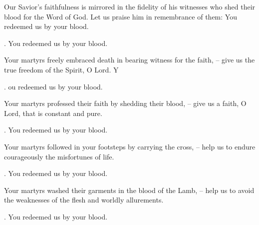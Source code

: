 \lettrine[lines=2]{O}{}ur Savior’s faithfulness is mirrored in the fidelity of his witnesses who shed their blood for the Word of God. Let us praise him in remembrance of them: You redeemed us by your blood.
\par \Rbar. You redeemed us by your blood.

Your martyrs freely embraced death in bearing witness for the faith,
– give us the true freedom of the Spirit, O Lord.
Y\par \Rbar. ou redeemed us by your blood.

Your martyrs professed their faith by shedding their blood,
– give us a faith, O Lord, that is constant and pure.
\par \Rbar. You redeemed us by your blood.

Your martyrs followed in your footsteps by carrying the cross,
– help us to endure courageously the misfortunes of life.
\par \Rbar. You redeemed us by your blood.

Your martyrs washed their garments in the blood of the Lamb,
– help us to avoid the weaknesses of the flesh and worldly allurements.
\par \Rbar. You redeemed us by your blood.
